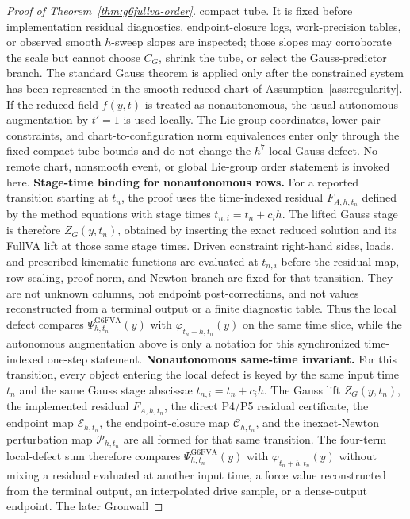\documentclass[preprint,12pt]{elsarticle}
\begin{document}
\begin{proof}[Proof of Theorem~\ref{thm:g6fullva-order}]
compact tube. It is fixed before implementation residual diagnostics,
endpoint-closure logs, work-precision tables, or observed smooth \(h\)-sweep
slopes are inspected; those slopes may corroborate the scale but cannot
choose \(C_G\), shrink the tube, or select the Gauss-predictor branch.
The standard Gauss theorem is applied only after the constrained system has
been represented in the smooth reduced chart of
Assumption~\ref{ass:regularity}. If the reduced field \(f(y,t)\) is treated as
nonautonomous, the usual autonomous augmentation by \(t'=1\) is used locally.
The Lie-group coordinates, lower-pair constraints, and chart-to-configuration
norm equivalences enter only through the fixed compact-tube bounds and do not
change the \(h^7\) local Gauss defect. No remote chart, nonsmooth event, or
global Lie-group order statement is invoked here.
\noindent\textbf{Stage-time binding for nonautonomous rows.}
For a reported transition starting at \(t_n\), the proof uses the
time-indexed residual \(F_{A,h,t_n}\) defined by the method equations with
stage times \(t_{n,i}=t_n+c_i h\).  The lifted Gauss stage is therefore
\(Z_G(y,t_n)\), obtained by inserting the exact reduced solution and its
FullVA lift at those same stage times.  Driven constraint right-hand sides,
loads, and prescribed kinematic functions are evaluated at \(t_{n,i}\)
before the residual map, row scaling, proof norm, and Newton branch are fixed
for that transition.  They are not unknown columns, not endpoint
post-corrections, and not values reconstructed from a terminal output or a
finite diagnostic table.  Thus the local defect compares
\(\Psi_{h,t_n}^{\mathrm{G6FVA}}(y)\) with
\(\varphi_{t_n+h,t_n}(y)\) on the same time slice, while the autonomous
augmentation above is only a notation for this synchronized time-indexed
one-step statement.
\noindent\textbf{Nonautonomous same-time invariant.}
For this transition, every object entering the local defect is keyed by the
same input time \(t_n\) and the same Gauss stage abscissae
\(t_{n,i}=t_n+c_i h\).  The Gauss lift \(Z_G(y,t_n)\), the implemented
residual \(F_{A,h,t_n}\), the direct P4/P5 residual certificate, the
endpoint map \(\mathcal E_{h,t_n}\), the endpoint-closure map
\(\mathcal C_{h,t_n}\), and the inexact-Newton perturbation map
\(\mathcal P_{h,t_n}\) are all formed for that same transition.  The
four-term local-defect sum therefore compares
\(\Psi_{h,t_n}^{\mathrm{G6FVA}}(y)\) with
\(\varphi_{t_n+h,t_n}(y)\) without mixing a residual evaluated at another
input time, a force value reconstructed from the terminal output, an
interpolated drive sample, or a dense-output endpoint.  The later Gronwall

\end{proof}
\end{document}
